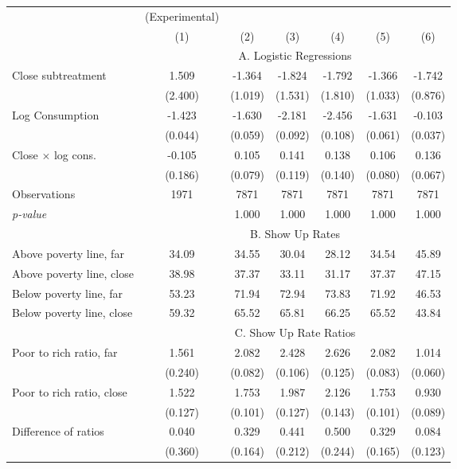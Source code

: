 \begin{tabular}{lcccccc}\toprule & (Experimental) \multicolumn{5}{c}{(See Models Above)} \\ \cmidrule(lr){3-7} 
& (1) & (2) & (3) & (4) & (5) & (6) \\ \midrule
 & \multicolumn{6}{c}{\centering A. Logistic Regressions}\\\cmidrule(lr){2-7} 
Close subtreatment & 1.509 & -1.364 & -1.824 & -1.792 & -1.366 & -1.742 \\ & (2.400) & (1.019) & (1.531) & (1.810) & (1.033) & (0.876) \\Log Consumption & -1.423 & -1.630 & -2.181 & -2.456 & -1.631 & -0.103 \\ & (0.044) & (0.059) & (0.092) & (0.108) & (0.061) & (0.037) \\Close $\times$ log cons. & -0.105 & 0.105 & 0.141 & 0.138 & 0.106 & 0.136 \\ & (0.186) & (0.079) & (0.119) & (0.140) & (0.080) & (0.067) \\Observations & 1971 & 7871& 7871& 7871& 7871& 7871\\\textit{p-value} & & 1.000 & 1.000 & 1.000 & 1.000 & 1.000 \\\midrule
 & \multicolumn{6}{c}{\centering B. Show Up Rates}\\\cmidrule(lr){2-7} 
Above poverty line, far & 34.09 & 34.55 & 30.04 & 28.12 & 34.54 & 45.89 \\Above poverty line, close & 38.98 & 37.37 & 33.11 & 31.17 & 37.37 & 47.15 \\Below poverty line, far & 53.23 & 71.94 & 72.94 & 73.83 & 71.92 & 46.53 \\Below poverty line, close & 59.32 & 65.52 & 65.81 & 66.25 & 65.52 & 43.84 \\\midrule
 & \multicolumn{6}{c}{\centering C. Show Up Rate Ratios}\\\cmidrule(lr){2-7} 
Poor to rich ratio, far & 1.561 & 2.082 & 2.428 & 2.626 & 2.082 & 1.014 \\ & (0.240) & (0.082) & (0.106) & (0.125) & (0.083) & (0.060) \\Poor to rich ratio, close & 1.522 & 1.753 & 1.987 & 2.126 & 1.753 & 0.930 \\ & (0.127) & (0.101) & (0.127) & (0.143) & (0.101) & (0.089) \\Difference of ratios & 0.040 & 0.329 & 0.441 & 0.500 & 0.329 & 0.084 \\ & (0.360) & (0.164) & (0.212) & (0.244) & (0.165) & (0.123) \\\bottomrule\end{tabular}